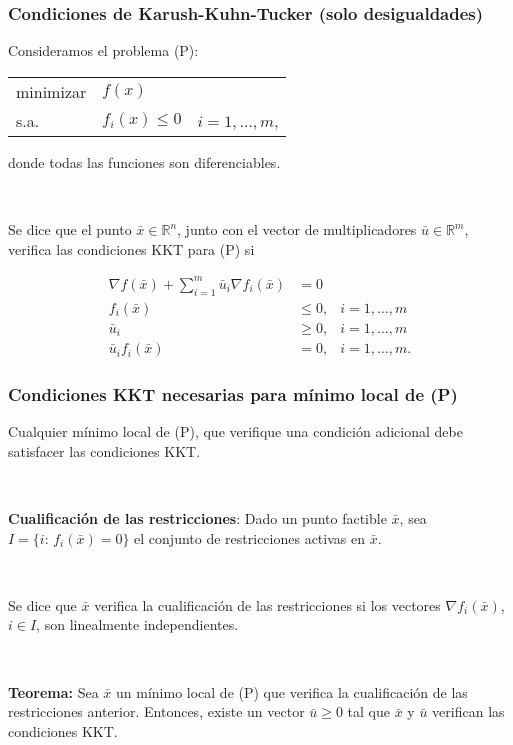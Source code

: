 \documentclass{beamer}
\begin{document}
\begin{frame}
\frametitle{Condiciones de Karush-Kuhn-Tucker (solo desigualdades)}

Consideramos el problema  (P):

\begin{center}
\begin{tabular}{lll}
minimizar & $f(x)$ &  \\
s.a. & $f_i(x)\leq 0$ & $i=1,\ldots,m $,
\end{tabular}
\end{center}
donde todas las funciones son diferenciables.

\


Se dice que el punto $\bar{x}\in\mathbb{R}^n$, junto con el vector de multiplicadores $\bar{u}\in\mathbb{R}^m$, verifica las condiciones KKT para (P) si

\begin{align*}
\nabla f(\bar{x}) + \sum_{i=1}^m \bar{u}_i \nabla f_i(\bar{x})  & = 0 \\
f_i(\bar{x}) &\leq 0, & i = 1,\ldots,m \\
\bar{u}_i    & \geq 0, & i = 1,\ldots,m\\
\bar{u}_i f_i(\bar{x}) &  = 0, & i = 1,\ldots,m.
\end{align*}













\end{frame}
\begin{frame}
\frametitle{Condiciones KKT necesarias para mínimo local de (P)}



Cualquier mínimo local de (P), que verifique una condición adicional debe satisfacer las condiciones   KKT.

\

\textbf{Cualificación de las restricciones}: Dado un punto factible $\bar{x}$, sea $I=\{i:\, f_i(\bar{x})=0\}$ el conjunto de restricciones activas en $\bar{x}$.

\

Se dice que $\bar{x}$ verifica la cualificación de las restricciones si  los vectores $\nabla f_i(\bar{x})$, $i\in I$, son linealmente independientes.


\

\textbf{Teorema:} Sea $\bar{x}$ un mínimo local de (P) que verifica la cualificación de las restricciones anterior. Entonces, existe un vector $\bar{u}\geq 0$ tal que $\bar{x}$ y $\bar{u}$ verifican las condiciones KKT.

\end{frame}
\end{document}
